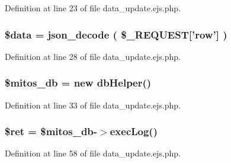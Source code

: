 \-Definition at line 23 of file data\-\_\-update.\-ejs.\-php.

\hypertarget{administration_2lists_2data__update_8ejs_8php_a6efc15b5a2314dd4b5aaa556a375c6d6}{
\subsubsection[{\$data}]{\setlength{\rightskip}{0pt plus 5cm}\$data = json\-\_\-decode ( \$\-\_\-\-R\-E\-Q\-U\-E\-S\-T\mbox{[}'row'\mbox{]} )}}\label{administration_2lists_2data__update_8ejs_8php_a6efc15b5a2314dd4b5aaa556a375c6d6}


\-Definition at line 28 of file data\-\_\-update.\-ejs.\-php.

\hypertarget{administration_2lists_2data__update_8ejs_8php_ab5d961f93efe4e2e8d8374f01dd6c65a}{
\subsubsection[{\$mitos\-\_\-db}]{\setlength{\rightskip}{0pt plus 5cm}\$mitos\-\_\-db = new {\bf db\-Helper}()}}\label{administration_2lists_2data__update_8ejs_8php_ab5d961f93efe4e2e8d8374f01dd6c65a}


\-Definition at line 33 of file data\-\_\-update.\-ejs.\-php.

\hypertarget{administration_2lists_2data__update_8ejs_8php_affd9e3eb0aad0a7ca42912cd925f148c}{
\subsubsection[{\$ret}]{\setlength{\rightskip}{0pt plus 5cm}\$ret = \$mitos\-\_\-db-\/$>$exec\-Log()}}\label{administration_2lists_2data__update_8ejs_8php_affd9e3eb0aad0a7ca42912cd925f148c}


\-Definition at line 58 of file data\-\_\-update.\-ejs.\-php.

